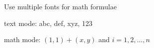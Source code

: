 \documentclass{article}
\begin{document}
\setcounter{tcb@cnt@example}{1}
\begin{example}{Use multiple fonts for math formulae}

\LARGE
text mode: abc, def, xyz, 123 \par
math mode: $(1,1) + (x, y)$ and $i = 1, 2, \dots, n$
\end{example}
\end{document}
